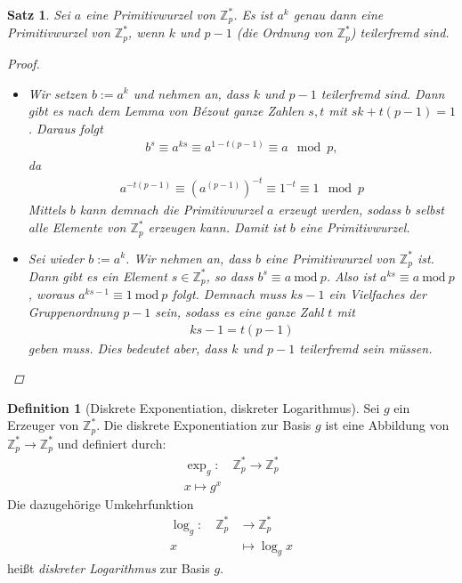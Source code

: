 \documentclass[
  a4paper,
  11pt,
]{scrartcl}
\theoremstyle{plain}
\newtheorem{satz}{Satz}
\theoremstyle{definition}
\newtheorem{definition}{Definition}
\theoremstyle{remark}
\newcommand{\Z}{\mathbb{Z}}
\newcommand{\Mod}[1]{\ \mathrm{mod}\ #1}
\begin{document}
\begin{satz}\label{satz:primitivwurzeln_durch_potenzen}
  Sei $a$ eine Primitivwurzel von $\Z_p^*$. Es ist $a^k$ genau dann eine
  Primitivwurzel von $\Z_p^*$, wenn $k$ und $p-1$ (die Ordnung von $\Z_p^*$)
  teilerfremd sind.

  \begin{proof}
    \begin{itemize}
      \item[„$\Rightarrow$“] Wir setzen $b := a^k$ und nehmen an, dass $k$ und
        $p-1$ teilerfremd sind. Dann gibt es nach dem Lemma von Bézout ganze
        Zahlen $s, t$ mit $s k + t (p-1) = 1$. Daraus folgt
        \begin{align*}
          b^s \equiv a^{k s} \equiv a^{1 - t (p-1)} \equiv a \mod p,
        \end{align*}
        da
        \begin{align*}
          a^{- t (p-1)} \equiv {\left(a^{(p-1)}\right)}^{-t} \equiv 1^{-t} \equiv 1 \mod p
        \end{align*}
        Mittels $b$ kann demnach die Primitivwurzel $a$ erzeugt werden, sodass
        $b$ selbst alle Elemente von $\Z_p^*$ erzeugen kann. Damit ist $b$ eine
        Primitivwurzel.
      \item[„$\Leftarrow$“] Sei wieder $b := a^k$. Wir nehmen an, dass $b$ eine
        Primitivwurzel von $\Z_p^*$ ist. Dann gibt es ein Element
        $s \in \Z_p^*$, so dass $b^s \equiv a \Mod{p}$. Also ist
        $a^{ks} \equiv a \Mod{p}$, woraus $a^{ks - 1} \equiv 1 \Mod{p}$ folgt.
        Demnach muss $ks-1$ ein Vielfaches der Gruppenordnung $p-1$ sein, sodass
        es eine ganze Zahl $t$ mit
        \begin{align*}
          ks - 1 = t(p-1)
        \end{align*}
        geben muss. Dies bedeutet aber, dass $k$ und $p-1$ teilerfremd sein
        müssen.
    \end{itemize}
  \end{proof}
\end{satz}

\begin{definition}[Diskrete Exponentiation, diskreter Logarithmus]
  Sei $g$ ein Erzeuger von $\Z_p^*$. Die diskrete Exponentiation zur Basis $g$
  ist eine Abbildung von $\Z_p^* \to \Z_p^*$ und definiert durch:
  \begin{align*}
    \exp_g: \quad \Z_p^* \to \Z_p^*\\
    x \mapsto g^x
  \end{align*}
  Die dazugehörige Umkehrfunktion
  \begin{align*}
    \log_g: \quad \Z_p^* & \to \Z_p^*\\
    x & \mapsto \log_g x
  \end{align*}
  heißt \emph{diskreter Logarithmus} zur Basis $g$.
\end{definition}
\end{document}
